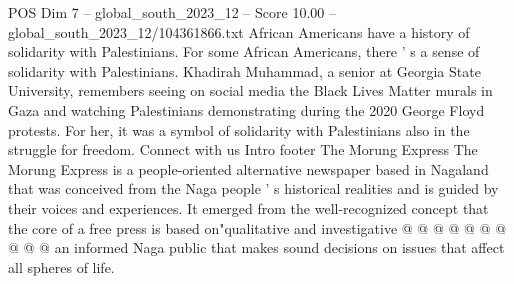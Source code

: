 \begin{textsample}{POS Dim 7 – global\_south\_2023\_12 – Score 10.00 – global\_south\_2023\_12/104361866.txt}
African Americans have a history of solidarity with Palestinians.
For some African Americans, there ' s a sense of solidarity with Palestinians.
Khadirah Muhammad, a senior at Georgia State University, remembers seeing on social media the Black Lives Matter murals in Gaza and watching Palestinians demonstrating during the 2020 George Floyd protests.
For her, it was a symbol of solidarity with Palestinians also in the struggle for freedom.
Connect with us Intro footer The Morung Express The Morung Express is a people-oriented alternative newspaper based in Nagaland that was conceived from the Naga people ' s historical realities and is guided by their voices and experiences.
It emerged from the well-recognized concept that the core of a free press is based on"qualitative and investigative @ @ @ @ @ @ @ @ @ @ an informed Naga public that makes sound decisions on issues that affect all spheres of life.

\end{textsample}
